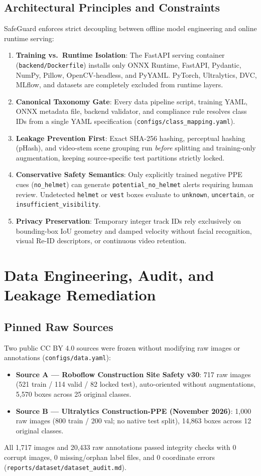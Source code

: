 \documentclass[11pt,a4paper]{article}
\begin{document}
\subsection{Architectural Principles and Constraints}
SafeGuard enforces strict decoupling between offline model engineering and online runtime serving:
\begin{enumerate}
  \item \textbf{Training vs.\ Runtime Isolation}: The FastAPI serving container (\texttt{backend/Dockerfile}) installs only ONNX Runtime, FastAPI, Pydantic, NumPy, Pillow, OpenCV-headless, and PyYAML. PyTorch, Ultralytics, DVC, MLflow, and datasets are completely excluded from runtime layers.
  \item \textbf{Canonical Taxonomy Gate}: Every data pipeline script, training YAML, ONNX metadata file, backend validator, and compliance rule resolves class IDs from a single YAML specification (\texttt{configs/class\_mapping.yaml}).
  \item \textbf{Leakage Prevention First}: Exact SHA-256 hashing, perceptual hashing (pHash), and video-stem scene grouping run \emph{before} splitting and training-only augmentation, keeping source-specific test partitions strictly locked.
  \item \textbf{Conservative Safety Semantics}: Only explicitly trained negative PPE cues (\texttt{no\_helmet}) can generate \texttt{potential\_no\_helmet} alerts requiring human review. Undetected \texttt{helmet} or \texttt{vest} boxes evaluate to \texttt{unknown}, \texttt{uncertain}, or \texttt{insufficient\_visibility}.
  \item \textbf{Privacy Preservation}: Temporary integer track IDs rely exclusively on bounding-box IoU geometry and damped velocity without facial recognition, visual Re-ID descriptors, or continuous video retention.
\end{enumerate}

\section{Data Engineering, Audit, and Leakage Remediation}

\subsection{Pinned Raw Sources}
Two public CC BY 4.0 sources were frozen without modifying raw images or annotations (\texttt{configs/data.yaml}):
\begin{itemize}
  \item \textbf{Source A — Roboflow Construction Site Safety v30}: 717 raw images (521 train / 114 valid / 82 locked test), auto-oriented without augmentations, 5,570 boxes across 25 original classes.
  \item \textbf{Source B — Ultralytics Construction-PPE (November 2026)}: 1,000 raw images (800 train / 200 val; no native test split), 14,863 boxes across 12 original classes.
\end{itemize}
All 1,717 images and 20,433 raw annotations passed integrity checks with 0 corrupt images, 0 missing/orphan label files, and 0 coordinate errors (\texttt{reports/dataset/dataset\_audit.md}).
\end{document}
